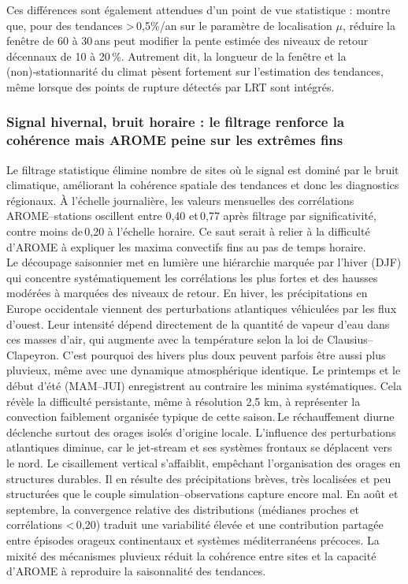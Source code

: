 \documentclass[
  article,
  nofooter,
  noheadings]{jss}
\begin{document}
Ces différences sont également attendues d'un point de vue statistique :
\citet{DeGaetano2018} montre que, pour des tendances
\textgreater\,0,5\%/an sur le paramètre de localisation \(\mu\), réduire
la fenêtre de 60 à 30\,ans peut modifier la pente estimée des niveaux de
retour décennaux de 10 à 20\,\%. Autrement dit, la longueur de la
fenêtre et la (non)‑stationnarité du climat pèsent fortement sur
l'estimation des tendances, même lorsque des points de rupture détectés
par LRT sont intégrés.

\subsubsection{Signal hivernal, bruit horaire : le filtrage renforce la
cohérence mais AROME peine sur les extrêmes
fins}\label{signal-hivernal-bruit-horaire-le-filtrage-renforce-la-cohuxe9rence-mais-arome-peine-sur-les-extruxeames-fins}

Le filtrage statistique élimine nombre de sites où le signal est dominé
par le bruit climatique, améliorant la cohérence spatiale des tendances
et donc les diagnostics régionaux. À l'échelle journalière, les valeurs
mensuelles des corrélations AROME--stations oscillent entre 0,40
et\,0,77 après filtrage par significativité, contre moins de\,0,20 à
l'échelle horaire. Ce saut serait à relier à la difficulté d'AROME à
expliquer les maxima convectifs fins au pas de temps horaire.\\

Le découpage saisonnier met en lumière une hiérarchie marquée par
l'hiver (DJF) qui concentre systématiquement les corrélations les plus
fortes et des hausses modérées à marquées des niveaux de retour. En
hiver, les précipitations en Europe occidentale viennent des
perturbations atlantiques véhiculées par les flux d'ouest. Leur
intensité dépend directement de la quantité de vapeur d'eau dans ces
masses d'air, qui augmente avec la température selon la loi de
Clausius--Clapeyron. C'est pourquoi des hivers plus doux peuvent parfois
être aussi plus pluvieux, même avec une dynamique atmosphérique
identique. Le printemps et le début d'été (MAM--JUI) enregistrent au
contraire les minima systématiques. Cela révèle la difficulté
persistante, même à résolution 2,5 km, à représenter la\,convection
faiblement organisée typique de cette saison.\,Le réchauffement diurne
déclenche surtout des orages isolés d'origine locale. L'influence des
perturbations atlantiques diminue, car le jet‑stream et ses systèmes
frontaux se déplacent vers le nord. Le cisaillement vertical
s'affaiblit, empêchant l'organisation des orages en structures durables.
Il en résulte des précipitations brèves, très localisées et peu
structurées que le couple simulation--observations capture encore mal.
En août et septembre, la convergence relative des distributions
(médianes proches et corrélations \textless\,0,20) traduit une
variabilité élevée et une contribution partagée entre épisodes orageux
continentaux et systèmes méditerranéens précoces. La mixité des
mécanismes pluvieux réduit la cohérence entre sites et la capacité
d'AROME à reproduire la saisonnalité des tendances.
\end{document}
